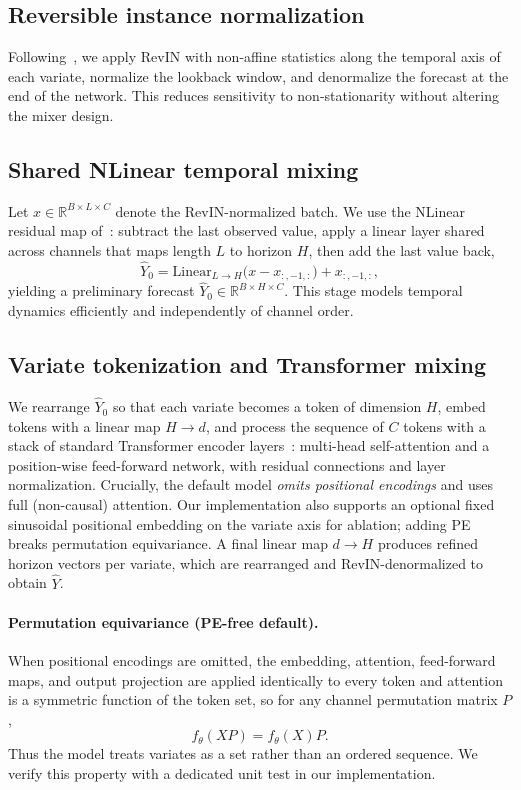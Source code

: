 \documentclass{article}
\begin{document}
\subsection{Reversible instance normalization}
Following~\citet{kim2021revin}, we apply RevIN with non-affine statistics along the temporal axis of each variate, normalize the lookback window, and denormalize the forecast at the end of the network.
This reduces sensitivity to non-stationarity without altering the mixer design.

\subsection{Shared NLinear temporal mixing}
Let $x \in \mathbb{R}^{B \times L \times C}$ denote the RevIN-normalized batch.
We use the NLinear residual map of~\citet{zeng2023dlinear}: subtract the last observed value, apply a linear layer shared across channels that maps length $L$ to horizon $H$, then add the last value back,
\begin{equation}
  \hat Y_0
  =
  \mathrm{Linear}_{L \rightarrow H}\!\bigl(x - x_{:,-1,:}\bigr) + x_{:,-1,:},
\end{equation}
yielding a preliminary forecast $\hat Y_0 \in \mathbb{R}^{B \times H \times C}$.
This stage models temporal dynamics efficiently and independently of channel order.

\subsection{Variate tokenization and Transformer mixing}
We rearrange $\hat Y_0$ so that each variate becomes a token of dimension $H$, embed tokens with a linear map $H \rightarrow d$, and process the sequence of $C$ tokens with a stack of standard Transformer encoder layers~\citep{vaswani2017attention}: multi-head self-attention and a position-wise feed-forward network, with residual connections and layer normalization.
Crucially, the default model \emph{omits positional encodings} and uses full (non-causal) attention.
Our implementation also supports an optional fixed sinusoidal positional embedding on the variate axis for ablation; adding PE breaks permutation equivariance.
A final linear map $d \rightarrow H$ produces refined horizon vectors per variate, which are rearranged and RevIN-denormalized to obtain $\hat Y$.

\paragraph{Permutation equivariance (PE-free default).}
When positional encodings are omitted, the embedding, attention, feed-forward maps, and output projection are applied identically to every token and attention is a symmetric function of the token set, so for any channel permutation matrix $P$,
\begin{equation}
  f_\theta(XP) = f_\theta(X)P.
\end{equation}
Thus the model treats variates as a set rather than an ordered sequence.
We verify this property with a dedicated unit test in our implementation.
\end{document}
